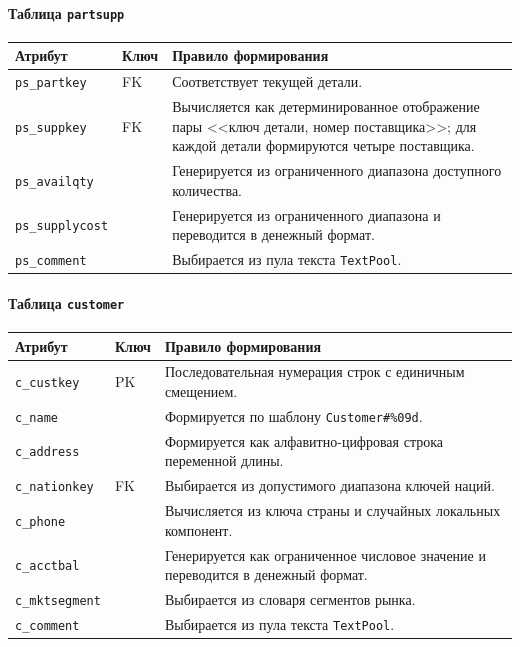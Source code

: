 \paragraph{Таблица \texttt{partsupp}}
\begin{center}
\small
\begin{tabular}{|p{}|p{}|p{}|}
\hline
\textbf{Атрибут} & \textbf{Ключ} & \textbf{Правило формирования} \\
\hline
\texttt{ps\_partkey} & FK & Соответствует текущей детали. \\
\hline
\texttt{ps\_suppkey} & FK & Вычисляется как детерминированное отображение пары <<ключ детали, номер поставщика>>; для каждой детали формируются четыре поставщика. \\
\hline
\texttt{ps\_availqty} &  & Генерируется из ограниченного диапазона доступного количества. \\
\hline
\texttt{ps\_supplycost} &  & Генерируется из ограниченного диапазона и переводится в денежный формат. \\
\hline
\texttt{ps\_comment} &  & Выбирается из пула текста \texttt{TextPool}. \\
\hline
\end{tabular}
\end{center}

\paragraph{Таблица \texttt{customer}}
\begin{center}
\small
\begin{tabular}{|p{}|p{}|p{}|}
\hline
\textbf{Атрибут} & \textbf{Ключ} & \textbf{Правило формирования} \\
\hline
\texttt{c\_custkey} & PK & Последовательная нумерация строк с единичным смещением. \\
\hline
\texttt{c\_name} &  & Формируется по шаблону \texttt{Customer\#\%09d}. \\
\hline
\texttt{c\_address} &  & Формируется как алфавитно-цифровая строка переменной длины. \\
\hline
\texttt{c\_nationkey} & FK & Выбирается из допустимого диапазона ключей наций. \\
\hline
\texttt{c\_phone} &  & Вычисляется из ключа страны и случайных локальных компонент. \\
\hline
\texttt{c\_acctbal} &  & Генерируется как ограниченное числовое значение и переводится в денежный формат. \\
\hline
\texttt{c\_mktsegment} &  & Выбирается из словаря сегментов рынка. \\
\hline
\texttt{c\_comment} &  & Выбирается из пула текста \texttt{TextPool}. \\
\hline
\end{tabular}
\end{center}


